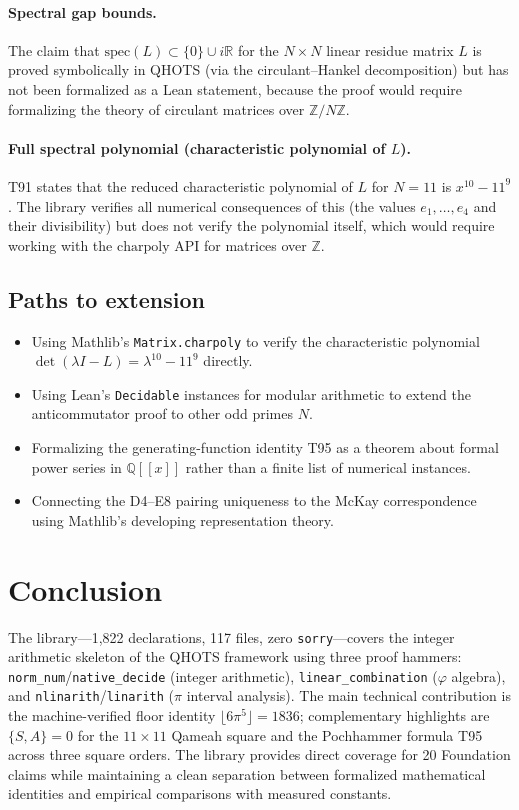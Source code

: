 \documentclass[11pt,a4paper]{article}
\begin{document}
\paragraph{Spectral gap bounds.}
The claim that $\mathrm{spec}(L)\subset \{0\}\cup i\mathbb{R}$ for the
$N\times N$ linear residue matrix $L$ is proved symbolically in QHOTS
(via the circulant--Hankel decomposition) but has not been formalized
as a Lean statement, because the proof would require formalizing the
theory of circulant matrices over $\mathbb{Z}/N\mathbb{Z}$.

\paragraph{Full spectral polynomial (characteristic polynomial of $L$).}
T91 states that the reduced characteristic polynomial of $L$ for $N=11$
is $x^{10} - 11^9$.  The library verifies all numerical consequences of
this (the values $e_1,\ldots,e_4$ and their divisibility) but does not
verify the polynomial itself, which would require working with the
$\mathrm{charpoly}$ API for matrices over $\mathbb{Z}$.

\subsection{Paths to extension}

\begin{itemize}
  \item Using Mathlib's \texttt{Matrix.charpoly} to verify the characteristic
        polynomial $\det(\lambda I - L) = \lambda^{10} - 11^9$ directly.
  \item Using Lean's \texttt{Decidable} instances for modular arithmetic to
        extend the anticommutator proof to other odd primes $N$.
  \item Formalizing the generating-function identity T95 as a theorem
        about formal power series in $\mathbb{Q}[[x]]$ rather than a
        finite list of numerical instances.
  \item Connecting the D4--E8 pairing uniqueness to the McKay correspondence
        using Mathlib's developing representation theory.
\end{itemize}

\section{Conclusion}
\label{sec:conclusion}

The library---1,822 declarations, 117 files, zero \texttt{sorry}---covers
the integer arithmetic skeleton of the QHOTS framework using three proof
hammers: \texttt{norm\_num}/\texttt{native\_decide} (integer arithmetic),
\texttt{linear\_combination} ($\varphi$ algebra), and
\texttt{nlinarith}/\texttt{linarith} ($\pi$ interval analysis).
The main technical contribution is the machine-verified floor identity
$\lfloor 6\pi^5\rfloor = 1836$; complementary highlights are $\{S,A\}=0$
for the $11\times 11$ Qameah square and the Pochhammer formula T95 across
three square orders.  The library provides direct coverage for 20 Foundation
claims while maintaining a clean separation between formalized mathematical
identities and empirical comparisons with measured constants.
\end{document}
